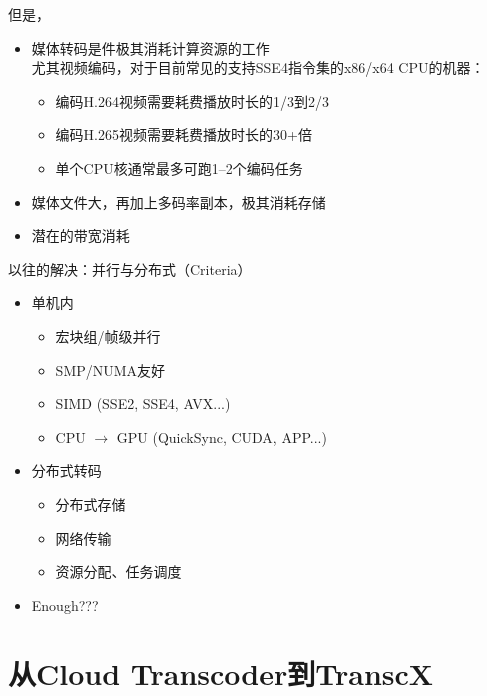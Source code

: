 \documentclass{beamer}
\begin{document}
\begin{frame}{但是，}
\pause
\begin{itemize}
\item 媒体转码是件极其消耗计算资源的工作\\ %
	尤其视频编码，对于目前常见的支持SSE4指令集的x86/x64 CPU的机器：
	\begin{itemize}
	\item  编码H.264视频需要耗费播放时长的1/3到2/3
	\item  编码H.265视频需要耗费播放时长的30+倍
	\item  单个CPU核通常最多可跑1--2个编码任务
	\end{itemize}
\item 媒体文件大，再加上多码率副本，极其消耗存储
\item 潜在的带宽消耗
\end{itemize}
\end{frame}

\begin{frame}{以往的解决：并行与分布式（Criteria）}
\begin{itemize}
\item 单机内\\
	\begin{itemize}
	\item 宏块组/帧级并行
	\item SMP/NUMA友好
	\item SIMD (SSE2, SSE4, AVX...)
	\item CPU $\rightarrow$ GPU (QuickSync, CUDA, APP...)
	\end{itemize}
\item 分布式转码
	\begin{itemize}
		\item 分布式存储
		\item 网络传输
		\item 资源分配、任务调度
	\end{itemize}
\item Enough???
\end{itemize}
\end{frame}

\section{从Cloud Transcoder到TranscX}
\end{document}
